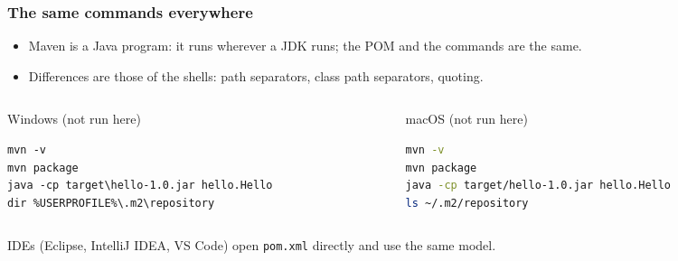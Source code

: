 \documentclass[aspectratio=169,10pt,compress]{beamer}
\begin{document}
\begin{frame}[t,fragile] \frametitle{The same commands everywhere}
  \begin{itemize}\small
    \item Maven is a Java program: it runs wherever a JDK runs; the POM and the commands are the same.
    \item Differences are those of the shells: path separators, class path separators, quoting.
  \end{itemize}
  \begin{columns}[T]
    \begin{column}{0.48\textwidth}
      \begin{block}{Windows (not run here)}


\begin{lstlisting}[style=codesnippet, language={}, basicstyle=\ttfamily\scriptsize]
mvn -v
mvn package
java -cp target\hello-1.0.jar hello.Hello
dir %USERPROFILE%\.m2\repository
\end{lstlisting}


      \end{block}
    \end{column}
    \begin{column}{0.48\textwidth}
      \begin{block}{macOS (not run here)}


\begin{lstlisting}[style=codesnippet, language=bash, basicstyle=\ttfamily\scriptsize]
mvn -v
mvn package
java -cp target/hello-1.0.jar hello.Hello
ls ~/.m2/repository
\end{lstlisting}


      \end{block}
    \end{column}
  \end{columns}

  \small IDEs (Eclipse, IntelliJ IDEA, VS Code) open \texttt{pom.xml} directly and use the same model.
\end{frame}

\end{document}
